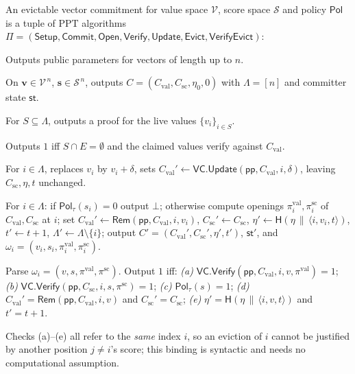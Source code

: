 \documentclass[version=submission]{iacrcc}
\theoremstyle{definition}
\newcommand{\secpar}{\lambda}
\newcommand{\PPT}{\mathrm{PPT}}
\newcommand{\bit}{\{0,1\}}
\newcommand{\concat}{\,\|\,}
\newcommand{\Setup}{\mathsf{Setup}}
\newcommand{\Commit}{\mathsf{Commit}}
\newcommand{\Open}{\mathsf{Open}}
\newcommand{\Vfy}{\mathsf{Verify}}
\newcommand{\Update}{\mathsf{Update}}
\newcommand{\Evict}{\mathsf{Evict}}
\newcommand{\VfyEvict}{\mathsf{VerifyEvict}}
\newcommand{\Rem}{\mathsf{Rem}}
\newcommand{\pp}{\mathsf{pp}}
\newcommand{\aux}{\mathsf{st}}
\newcommand{\Pol}{\mathsf{Pol}}
\newcommand{\Val}{\mathrm{val}}
\newcommand{\Sc}{\mathrm{sc}}
\newcommand{\Cval}{C_{\Val}}
\newcommand{\Csc}{C_{\Sc}}
\newcommand{\Live}{\Lambda}
\newcommand{\Evicted}{E}
\newcommand{\Vsp}{\mathcal{V}}
\newcommand{\Ssp}{\mathcal{S}}
\newcommand{\hash}{\mathsf{H}}
\newcommand{\VC}{\mathsf{VC}}
\begin{document}
\begin{definition}[EvictVC]\label{def:evictvc}
An evictable vector commitment for value space $\Vsp$, score space $\Ssp$ and
policy $\Pol$ is a tuple of $\PPT$ algorithms
$\Pi=(\Setup,\Commit,\Open,\Vfy,\Update,\Evict,\VfyEvict)$:
\begin{description}[leftmargin=0em,itemsep=4pt]
\item[$\Setup(1^\secpar,1^n)\to\pp$.] Outputs public parameters for vectors of
      length up to $n$.
\item[$\Commit(\pp,\mathbf{v},\mathbf{s})\to(C,\aux)$.] On
      $\mathbf{v}\in\Vsp^{\,n}$, $\mathbf{s}\in\Ssp^{\,n}$, outputs
      $C=(\Cval,\Csc,\eta_0,0)$ with $\Live=[n]$ and committer state $\aux$.
\item[$\Open(\pp,\aux,S)\to\pi$.] For $S\subseteq\Live$, outputs a proof for the
      live values $\{v_i\}_{i\in S}$.
\item[$\Vfy(\pp,C,\Evicted,S,\{v_i\}_{i\in S},\pi)\to\bit$.] Outputs $1$ iff
      $S\cap\Evicted=\emptyset$ and the claimed values verify against $\Cval$.
\item[$\Update(\pp,\aux,i,\delta)\to(C',\aux')$.] For $i\in\Live$, replaces $v_i$
      by $v_i+\delta$, sets $\Cval'\leftarrow\VC.\Update(\pp,\Cval,i,\delta)$,
      leaving $\Csc,\eta,t$ unchanged.
\item[$\Evict(\pp,\aux,i,\tau)\to(C',\aux',\omega_i)$ \textnormal{or} $\bot$.]
      For $i\in\Live$: if $\Pol_\tau(s_i)=0$ output $\bot$; otherwise compute
      openings $\pi_i^{\Val},\pi_i^{\Sc}$ of $\Cval,\Csc$ at $i$; set
      $\Cval'\leftarrow\Rem(\pp,\Cval,i,v_i)$, $\Csc'\leftarrow\Csc$,
      $\eta'\leftarrow\hash(\eta\concat\langle i,v_i,t\rangle)$, $t'\leftarrow t+1$,
      $\Live'\leftarrow\Live\setminus\{i\}$; output $C'=(\Cval',\Csc',\eta',t')$,
      $\aux'$, and $\omega_i=(v_i,s_i,\pi_i^{\Val},\pi_i^{\Sc})$.
\item[$\VfyEvict(\pp,C,i,\tau,\omega_i,C')\to\bit$.] Parse
      $\omega_i=(v,s,\pi^{\Val},\pi^{\Sc})$. Output $1$ iff:
      \emph{(a)} $\VC.\Vfy(\pp,\Cval,i,v,\pi^{\Val})=1$;
      \emph{(b)} $\VC.\Vfy(\pp,\Csc,i,s,\pi^{\Sc})=1$;
      \emph{(c)} $\Pol_\tau(s)=1$;
      \emph{(d)} $\Cval'=\Rem(\pp,\Cval,i,v)$ and $\Csc'=\Csc$;
      \emph{(e)} $\eta'=\hash(\eta\concat\langle i,v,t\rangle)$ and $t'=t+1$.
\end{description}
\end{definition}

\begin{remark}
Checks (a)--(e) all refer to the \emph{same} index $i$, so an eviction of $i$
cannot be justified by another position $j\neq i$'s score; this binding is
syntactic and needs no computational assumption.
\end{remark}
\end{document}
